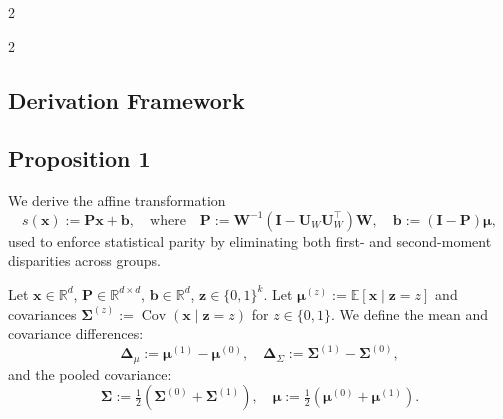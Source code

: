 \documentclass[ecta,nameyear,final]{econsocart}
\numberwithin{equation}{section}
\theoremstyle{plain}
\theoremstyle{definition}
\begin{document}
\begin{multicols}{2}
\newpage





\end{multicols}{2}
\newpage
\begin{appendix}
\section{Derivation Framework}
\subsection{Proposition 1} \label{Proposition 1}
We derive the affine transformation
$$
s(\mathbf{x}) := \mathbf{P}\mathbf{x} + \mathbf{b}, \quad \text{where} \quad 
\mathbf{P} := \mathbf{W}^{-1} (\mathbf{I} - \mathbf{U}_W \mathbf{U}_W^\top) \mathbf{W}, \quad 
\mathbf{b} := (\mathbf{I} - \mathbf{P}) \boldsymbol{\mu},
$$
used to enforce statistical parity by eliminating both first- and second-moment disparities across groups.

Let $\mathbf{x} \in \mathbb{R}^d$, $\mathbf{P} \in \mathbb{R}^{d \times d}$, $\mathbf{b} \in \mathbb{R}^d$, $\mathbf{z} \in \{0,1\}^k$. 
Let $\boldsymbol{\mu}^{(z)} := \mathbb{E}[\mathbf{x} \mid \mathbf{z}=z]$ and covariances $\boldsymbol{\Sigma}^{(z)} := \operatorname{Cov}(\mathbf{x} \mid \mathbf{z}=z)$ for $z \in \{0,1\}$. We define the mean and covariance differences:
$$
\boldsymbol{\Delta}_{\mu} := \boldsymbol{\mu}^{(1)} - \boldsymbol{\mu}^{(0)}, \quad \boldsymbol{\Delta}_{\Sigma} := \boldsymbol{\Sigma}^{(1)} - \boldsymbol{\Sigma}^{(0)},
$$
and the pooled covariance:
$$
\boldsymbol{\Sigma} := \tfrac{1}{2}(\boldsymbol{\Sigma}^{(0)} + \boldsymbol{\Sigma}^{(1)}), \quad \boldsymbol{\mu} := \tfrac{1}{2}(\boldsymbol{\mu}^{(0)} + \boldsymbol{\mu}^{(1)}).
$$


\end{appendix}
\end{document}
